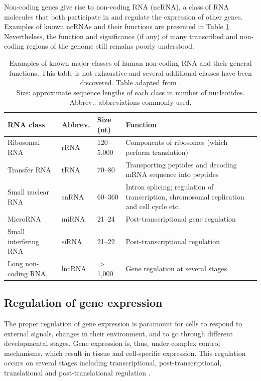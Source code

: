 Non-coding genes give rise to non-coding RNA (ncRNA), a class of RNA molecules
that both participate in and regulate the expression of other genes.
Examples of known ncRNAs and their functions are presented in Table
\ref{table:rnas}. Nevertheless, the function and significance (if any) of many
transcribed and non-coding regions of the genome still remains poorly understood.

\begin{table}
  \caption{Examples of known major classes of human non-coding RNA and their
  general functions. This table is not exhaustive and several additional classes have
  been discovered. Table adapted from \citep{Strachan2011}. \\
  Size: approximate sequence lengths of each class in number of nucleotides.
  Abbrev.: abbreviations commonly used.}
  \label{table:rnas}
  \centering
  {\fontsize{10pt}{12pt}\selectfont
  \begin{tabular}{ lllp{6cm} }
    \hline
    \textbf{RNA class} & \textbf{Abbrev.} & \textbf{Size (nt)} & \textbf{Function} \\
    \hline
    Ribosomal RNA         & rRNA   & 120--5,000  & Components of ribosomes (which perform translation) \\
    Transfer RNA          & tRNA   & 70--80     & Transporting peptides and decoding mRNA sequence into peptides \\
    Small nuclear RNA     & snRNA  & 60--360    & Intron splicing; regulation of transcription, chromosomal replication and cell cycle etc.  \\
    MicroRNA              & miRNA  & 21--24     & Post-transcriptional gene regulation \\
    Small interfering RNA & siRNA  & 21--22     & Post-transcriptional regulation \\
    Long non-coding RNA   & lncRNA & $>$ 1,000   & Gene regulation at several stages \\
    \hline
  \end{tabular}
  }
\end{table}




\subsection{Regulation of gene expression}\label{regulation-of-gene-expression}

The proper regulation of gene expression is paramount for cells to respond to
external signals, changes in their environment, and to go through different
developmental stages. Gene expression is, thus, under complex control mechanisms,
which result in tissue and cell-specific expression. This regulation
occurs on several stages including transcriptional, post-transcriptional,
translational and post-translational regulation \citep{Strachan2011}.


